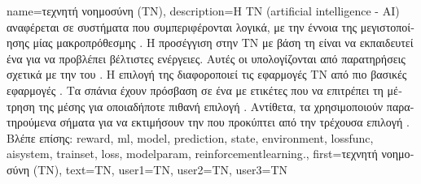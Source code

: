{name={\foreignlanguage{greek}{τεχνητή νοημοσύνη (ΤΝ)}}, 
	description={\foreignlanguage{greek}{Η ΤΝ} 
		(artificial intelligence - AI) \foreignlanguage{greek}{αναφέρεται σε συστήματα που συμπεριφέρονται λογικά, 
		με την έννοια της μεγιστοποί\-η\-σης μίας μακροπρόθεσμης} . \foreignlanguage{greek}{Η 
		προσέγγιση στην ΤΝ με βάση τη}  \foreignlanguage{greek}{είναι να εκπαιδευτεί ένα} 
		 \foreignlanguage{greek}{για να προβλέπει βέλτιστες ενέργειες. Αυτές οι}  
		\foreignlanguage{greek}{υπολογίζονται από παρατηρήσεις σχετικά με την}  \foreignlanguage{greek}{του} 
		. \foreignlanguage{greek}{Η επιλογή της}  \foreignlanguage{greek}{διαφοροποιεί 
		τις εφαρμογές ΤΝ από πιο βασικές εφαρμογές} . \foreignlanguage{greek}{Τα}  
		\foreignlanguage{greek}{σπάνια έχουν πρόσβαση σε ένα}  \foreignlanguage{greek}{με ετικέτες που να επιτρέπει 
		τη μέτρηση της μέσης}  \foreignlanguage{greek}{για οποιαδήποτε πιθανή επιλογή} . 
		\foreignlanguage{greek}{Αντίθετα, τα}  \foreignlanguage{greek}{χρησιμοποιούν παρατηρούμενα σήματα}  
		 \foreignlanguage{greek}{για να εκτιμήσουν την}  \foreignlanguage{greek}{που 
		προκύπτει από την τρέχουσα επιλογή} .
		\\
		\foreignlanguage{greek}{Βλέπε επίσης:} \gls{reward}, \gls{ml}, \gls{model}, \gls{prediction}, \gls{state}, \gls{environment}, \gls{lossfunc}, 
		\gls{aisystem}, \gls{trainset}, \gls{loss}, \gls{modelparam}, \gls{reinforcementlearning}.},
	first={\foreignlanguage{greek}{τεχνητή νοημοσύνη (ΤΝ)}},
	text={\foreignlanguage{greek}{ΤΝ}},
	user1={\foreignlanguage{greek}{ΤΝ}}, %
	user2={\foreignlanguage{greek}{ΤΝ}}, %
	user3={\foreignlanguage{greek}{ΤΝ}} %
}


